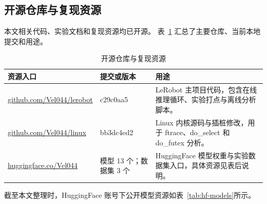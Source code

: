 
\begin{appendices}

\section{开源仓库与复现资源}\label{app:open-repos}

本文相关代码、实验文档和复现资源均已开源。
表~\ref{tab:open-repos} 汇总了主要仓库、当前本地提交和用途。

\begin{table}[htbp]
  \centering
  \caption{开源仓库与复现资源}
  \label{tab:open-repos}
  \small
  \begin{tabularx}{\textwidth}{@{}p{}p{}X@{}}
    \toprule
    资源入口 & 提交或版本 & 用途 \\
    \midrule
    \href{https://github.com/Vel044/lerobot}{github.com/Vel044/lerobot}
      & c29c0aa5
      & LeRobot 主项目代码，包含在线推理循环、实验打点与离线分析脚本。 \\
    \href{https://github.com/Vel044/linux}{github.com/Vel044/linux}
      & bb3dc4ed2
      & Linux 内核源码与插桩修改，用于 ftrace、do\_select 和 do\_futex 分析。 \\
    \href{https://huggingface.co/Vel044}{huggingface.co/Vel044}
      & 模型 13 个；数据集 3 个
      & HuggingFace 模型权重与实验数据集入口，具体资源见表后说明。 \\
    \bottomrule
  \end{tabularx}
\end{table}

截至本文整理时，HuggingFace 账号下公开模型资源如表~\ref{tab:hf-models}所示。


\end{appendices}
